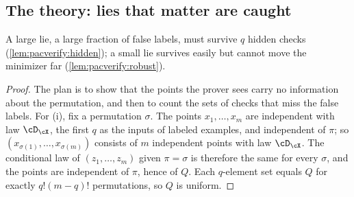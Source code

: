 \begin{refsection}
\section{The theory: lies that matter are caught}\label{sec:pacverify:theory}

A large lie, a large fraction of false labels, must survive $q$ hidden checks (\cref{lem:pacverify:hidden}); a small lie survives easily but cannot move the minimizer far (\cref{lem:pacverify:robust}).


\begin{proof}
The plan is to show that the points the prover sees carry no information about the permutation, and then to count the sets of checks that miss the false labels. For (i), fix a permutation $\sigma$. The points $x_1,\dots,x_m$ are independent with law $\cD_\cX$, the first $q$ as the inputs of labeled examples, and independent of $\pi$; so $(x_{\sigma(1)},\dots,x_{\sigma(m)})$ consists of $m$ independent points with law $\cD_\cX$. The conditional law of $(z_1,\dots,z_m)$ given $\pi=\sigma$ is therefore the same for every $\sigma$, and the points are independent of $\pi$, hence of $Q$. Each $q$-element set equals $Q$ for exactly $q!(m-q)!$ permutations, so $Q$ is uniform.


\end{proof}
\end{refsection}

